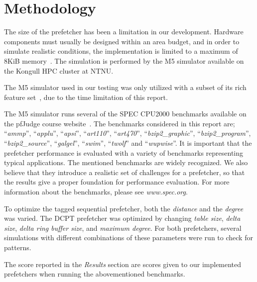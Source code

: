\section{Methodology}

The size of the prefetcher has been a limitation in our development. Hardware
components must usually be designed within an area budget, and in order to
simulate realistic conditions, the implementation is limited to a maximum of
8KiB memory~\cite{guidelines}. The simulation is performed by the M5 simulator
available on the Kongull HPC cluster at NTNU.

The M5 simulator used in our testing was only utilized with a subset of its rich
feature set~\cite{user_doc}, due to the time limitation of this report.



The M5 simulator runs several of the SPEC CPU2000 benchmarks available on the
pfJudge course website~\cite{guidelines}. The benchmarks considered in this report are;
``\emph{ammp}'', ``\emph{applu}'', ``\emph{apsi}'', ``\emph{art110}'',
``\emph{art470}'', ``\emph{bzip2\_graphic}'', ``\emph{bzip2\_program}'',
``\emph{bzip2\_source}'', ``\emph{galgel}'', ``\emph{swim}'', ``\emph{twolf}'' and
``\emph{wupwise}''. It is important that the prefetcher performance is 
evaluated with a variety of benchmarks representing typical applications. 
The mentioned benchmarks are widely recognized. We also believe that they 
introduce a realistic set of challenges for a prefetcher, so that the results give a 
proper foundation for performance evaluation.
For more information about the benchmarks, please see \emph{www.spec.org}.

To optimize the tagged sequential prefetcher, both the \emph{distance} and 
the \emph{degree} was varied. The DCPT prefetcher was optimized by changing 
\emph{table size}, \emph{delta size}, \emph{delta ring buffer size}, and \emph{maximum degree}. For both prefetchers, several 
simulations with different combinations of these parameters were run to check for patterns.


The score reported in the \textit{Results} section are scores given to our
implemented prefetchers when running the abovementioned benchmarks.

